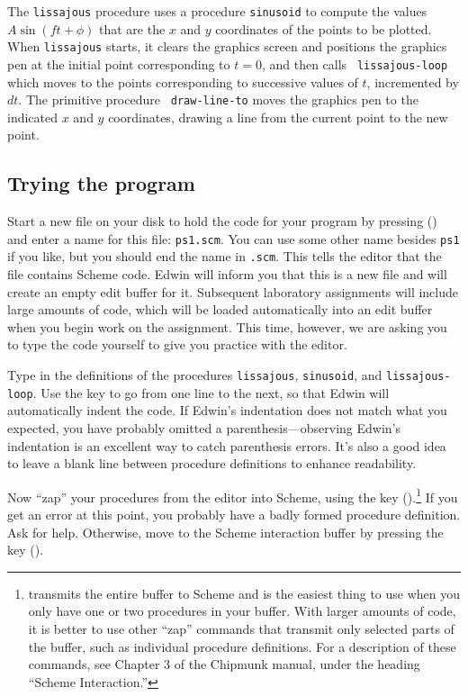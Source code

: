The {\tt lissajous} procedure uses a procedure {\tt sinusoid} to
compute the values $A \sin (f t + \phi)$ that are the $x$ and $y$
coordinates of the points to be plotted.  When {\tt lissajous} starts,
it clears the graphics screen and positions the graphics pen at the
initial point corresponding to $t=0$, and then calls {\tt
lissajous-loop} which moves to the points corresponding to successive
values of $t$, incremented by $dt$. The primitive procedure {\tt
draw-line-to} moves the graphics pen to the indicated $x$ and $y$
coordinates, drawing a line from the current point to the new point.


\subsection{Trying the program}

Start a new file on your disk to hold the code for your program by
pressing { (\shift {})} and enter a name for this
file: {\tt ps1.scm}.  You can use some other name besides {\tt ps1} if
you like, but you should end the name in {\tt .scm}.  This tells the
editor that the file contains Scheme code.  Edwin will inform you that
this is a new file and will create an empty edit buffer for it.
Subsequent laboratory assignments will include large amounts of code,
which will be loaded automatically into an edit buffer when you begin
work on the assignment.  This time, however, we are asking you to type
the code yourself to give you practice with the editor.

Type in the definitions of the procedures {\tt lissajous}, {\tt sinusoid}, and
{\tt lissajous-loop}.  Use the  key to go from one line to the next,
so that Edwin will automatically indent the code.  If Edwin's indentation does
not match what you expected, you have probably omitted a
parenthesis---observing Edwin's indentation is an excellent way to catch
parenthesis errors.  It's also a good idea to leave a blank line between
procedure definitions to enhance readability.

Now ``zap'' your procedures from the editor into Scheme, using the
 key ({\shift {}}).\footnote{ transmits the entire buffer to Scheme and is the easiest
thing to use when you only have one or two procedures in your buffer.
With larger amounts of code, it is better to use other ``zap''
commands that transmit only selected parts of the buffer, such as
individual procedure definitions.  For a description of these
commands, see Chapter 3 of the Chipmunk manual, under the heading
``Scheme Interaction.''}  If you get an error at this point, you
probably have a badly formed procedure definition.  Ask for help.
Otherwise, move to the Scheme interaction buffer by pressing the 
 key ().


